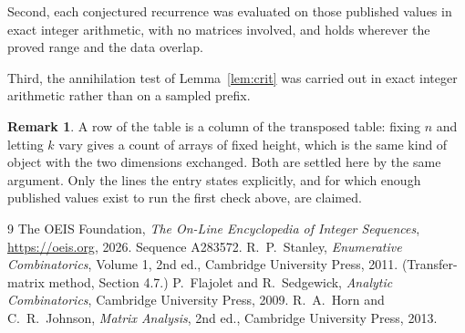 \documentclass[11pt,a4paper]{article}
\theoremstyle{plain}
\theoremstyle{definition}
\newtheorem{remark}[theorem]{Remark}
\begin{document}
Second, each conjectured recurrence was evaluated on those published values in exact
integer arithmetic, with no matrices involved, and holds wherever the proved range and the
data overlap.

Third, the annihilation test of Lemma~\ref{lem:crit} was carried out in exact integer
arithmetic rather than on a sampled prefix.

\begin{remark}
A row of the table is a column of the transposed table: fixing $n$ and letting $k$ vary gives a
count of arrays of fixed height, which is the same kind of object with the two dimensions
exchanged. Both are settled here by the same argument. Only the lines the entry states
explicitly, and for which enough published values exist to run the first check above, are
claimed.
\end{remark}

\begin{thebibliography}{9}
 The OEIS Foundation, \emph{The On-Line Encyclopedia of Integer
Sequences}, \url{https://oeis.org}, 2026. Sequence A283572.
 R.~P.~Stanley, \emph{Enumerative Combinatorics}, Volume 1, 2nd ed.,
Cambridge University Press, 2011. (Transfer-matrix method, Section 4.7.)
 P.~Flajolet and R.~Sedgewick, \emph{Analytic Combinatorics}, Cambridge
University Press, 2009.
 R.~A.~Horn and C.~R.~Johnson, \emph{Matrix Analysis}, 2nd ed., Cambridge
University Press, 2013.
\end{thebibliography}
\end{document}
